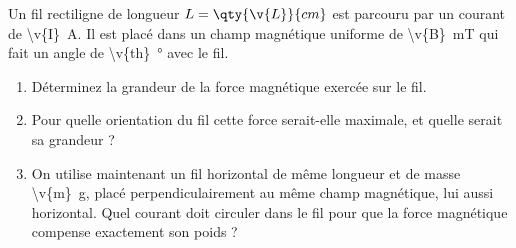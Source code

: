 Un fil rectiligne de longueur $L = \qty{\v{L}}{cm}$ est parcouru par un courant de \qty{\v{I}}{A}. Il est placé dans un champ magnétique uniforme de \qty{\v{B}}{mT} qui fait un angle de \qty{\v{th}}{\degree} avec le fil.

\begin{enumerate}[label=\alph*)]
    \item Déterminez la grandeur de la force magnétique exercée sur le fil.
    \item Pour quelle orientation du fil cette force serait-elle maximale, et quelle serait sa grandeur ?
    \item On utilise maintenant un fil horizontal de même longueur et de masse \qty{\v{m}}{g}, placé perpendiculairement au même champ magnétique, lui aussi horizontal. Quel courant doit circuler dans le fil pour que la force magnétique compense exactement son poids ?
\end{enumerate}

